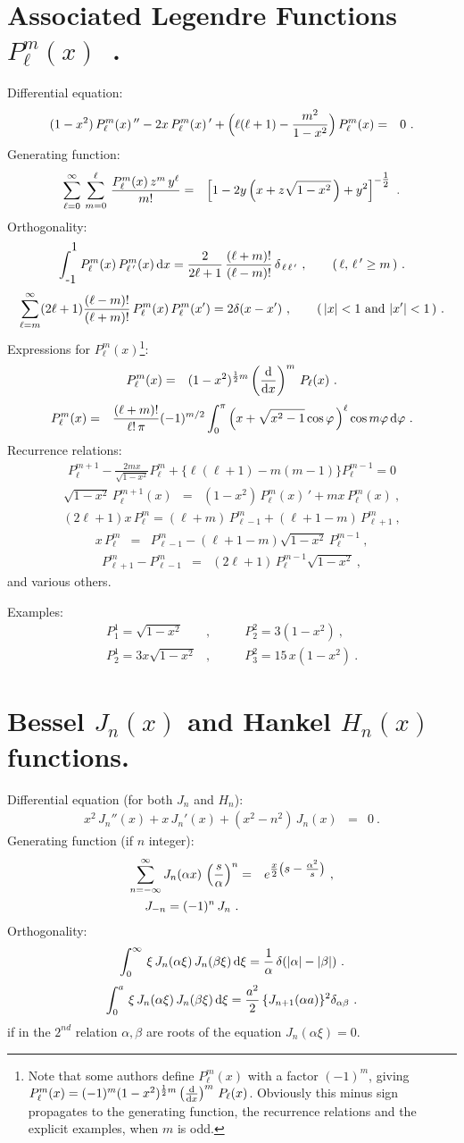 \documentclass[12pt]{article}
\def\a{\alpha}      \def\b{\beta}   \def\g{\gamma}      \def\G{\Gamma}
\def\d{\delta}      \def\D{\Delta}  \def\e{\varepsilon}
\def\dd{{\rm d}}  \def\bra{\langle}   \def\ket{\rangle}
\def\fract#1#2{{\textstyle{#1\over#2}}}
\def\ffract#1#2{\raise .3 em\hbox{$\scriptstyle#1$}\kern-.25em/
                \kern-.2em\lower .2 em \hbox{$\scriptstyle#2$}}
\def\fractje#1#2{{\scriptstyle{#1\over#2}}}
\def\half{\fract12} \def\quart{\fract14} \def\halff{\ffract12}
\def\halfje{\fractje12}
\def\ex#1{e^{\textstyle#1}}
\renewcommand{\^}[1]{\hat{#1}}
\newcommand{\be}{\begin{eqnarray}}
\newcommand{\ee}{\end{eqnarray}}
\newcommand{\nn}{\nonumber\\}
\newcommand{\nm}{\nonumber}
\newcommand{\newsec}[1]{\section{#1}\setcounter{equation}{0}}
\begin{document}
\newsec{Associated Legendre Functions \(P_\ell^m(x)\)\ .}
Differential equation: \be
(1-x^2)\,P_\ell^m(x)\,''-2x\,P_\ell^m(x)\,'+\Big(\ell(\ell+1)-{m^2\over
1-x^2}\Big)\,P_\ell^m(x)&=&0\ .\ee
 Generating function: \be\sum_{\ell=0}^\infty\,\sum_{m=0}^\ell\,
{P_\ell^m(x)\,z^m\,y^\ell\over m!}&=&\left[1-2y\left(x+z
\sqrt{1-x^2}\, \right)+y^2\right]^{-\half}\ .\ee
 Orthogonality: \be\int_{\raisebox{-.3em}{-1}}^{\raisebox {.3em}{1}}
P_\ell^m(x)\,P_{\ell\,'}^m(x)\,\dd x={2\over
2\ell+1}\,{(\ell+m)!\over (\ell-m)!}\,\d_{\,\ell\,\ell\,'}\
,\qquad (\,\ell,\,\ell\,'\geq m\,)\ .\ee \be \sum_{\ell=m}^\infty
(2\ell+1){(\ell-m)!\over(\ell+m)!}\,P_\ell^m(x)\,P_\ell^m(x')=
2\d(x-x')\ ,\qquad(\,|x|<1\hbox{ and }|x'|<1\,)\ .\ee
 \noindent Expressions for \(P^m_\ell(x)\)\footnote{Note that some authors define $P_\ell^m(x)$ with a factor
 $(-1)^m$, giving $P_\ell^m(x)=(-1)^m(1-x^2)^{\halfje m}\left(\dd\over\dd x\right)^m\,P_\ell(x)$. Obviously this minus
sign propagates to the generating function, the recurrence
relations and the explicit examples, when $m$ is odd.}: \be
P_\ell^m(x)&=&(1-x^2)^{\halfje m}\left(\dd\over\dd
x\right)^m\,P_\ell(x)\ .\ee \be P_\ell^m(x)&=&
{(\ell+m)!\over\ell!\,\pi}(-1)^{m/2}\int_0^\pi\Big(x+\sqrt{x^2-1}\cos\vv\,\Big)^\ell\cos
m\vv\,\dd\vv\ .\ee
 Recurrence relations: \be P_{\ell}^{m+1} -
 \frac{2mx}{\sqrt{1-x^2}}P_{\ell}^m +
 \{\ell(\ell+1)-m(m-1)\}P_{\ell}^{m-1} = 0\ee
\be \sqrt{1-x^2}\,P_\ell^{m+1}(x)&=&(1-x^2)\,P^m_\ell(x)\,'+ mx
\,P_\ell^m(x)\ ,\nm\ee \be (2\ell+1)x\,P_\ell^m
=(\ell+m)\,P_{\ell-1}^m+(\ell+1-m)\,P_{\ell+1}^m\ ,\ee \be
x\,P_\ell^m &=& P_{\ell-1}^m-(\ell+1-m)\sqrt{1-x^2}\,P_\ell^{m-1}\
,\nm\ee \be
P^m_{\ell+1}-P^m_{\ell-1}&=&(2\ell+1)\,P_\ell^{m-1}\sqrt{1-x^2}\
,\ee and various others. \par \noindent
 Examples: \be P_1^1=\sqrt{1-x^2}
&,\qquad& P_2^2=3(1-x^2)\ ,\nn P^1_2=3x\sqrt{1-x^2}&,\qquad&
P^2_3=15\,x(1-x^2)\ .\ee  \pagebreak[4]

\newsec{Bessel \(J_n(x)\) and Hankel \(H_n(x)\) functions.}
Differential equation (for both \(J_n\) and \(H_n\)): \be
x^2\,J_n''(x)+x\,J_n'(x)+(x^2-n^2)\,J_n(x)&=&0\ .\ee
 Generating function (if \(n\) integer): \be \sum_{n=-\infty}^\infty
J_n(\alpha x)\,\left(\frac{s}{\alpha}\right)^n&=&\ex{\fract x2\big(s-\frac {\alpha^2}s\big)}\ ,\\
J_{-n}=(-1)^n\,J_n\ .\nm\ee Orthogonality:
\be\int_0^\infty\,\xi\,J_n(\a\xi)\,J_n(\b\xi)\,\dd\xi ={ 1\over
\a}\,\d(|\a|-|\b|)\ .\ee
\be\int_0^a\,\xi\,J_n(\a\xi)\,J_n(\b\xi)\,\dd\xi ={ a^2\over
2}\,\{J_{n+1}(\a a)\}^{2}\d_{\a\b}\ .\ee if in the $2^{nd}$
relation $\a,\b$ are roots of the equation $J_n(\a\xi)=0$.
\end{document}
